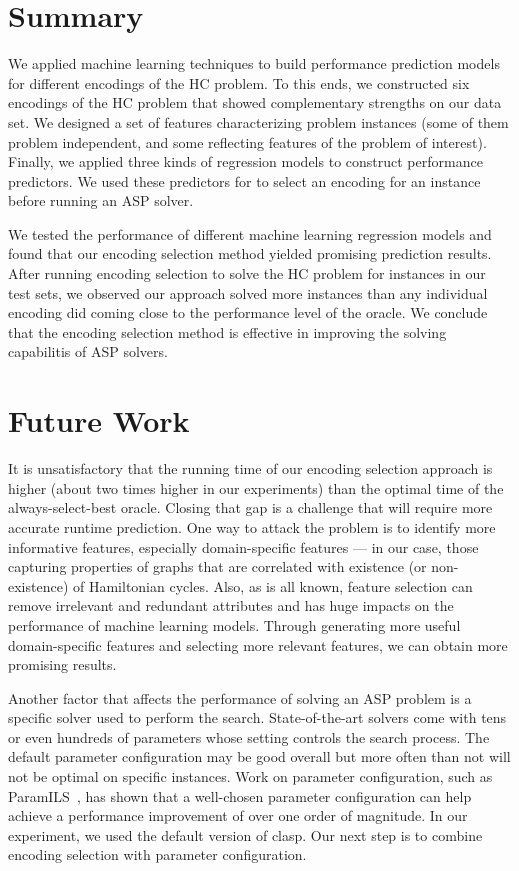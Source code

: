 \documentclass{new_tlp}
\begin{document}
\section{Summary}
We applied machine learning techniques to build performance prediction models
for different encodings of the HC problem. To this ends, we constructed
six encodings of the HC problem that showed complementary strengths on our 
data set. We designed a set of features characterizing problem instances (some
of them problem independent, and some reflecting features of the problem of 
interest). Finally, we applied three kinds of regression models to construct 
performance predictors. We used these predictors for to select an encoding 
for an instance before running an ASP solver. 

We tested the performance of different machine learning regression models and 
found that our encoding selection method yielded promising prediction results.
After running encoding selection to solve the HC problem for instances in our 
test sets, we observed our approach solved more instances than any individual 
encoding did coming close to the performance level of the oracle. We conclude 
that the encoding selection method is effective in improving the solving
capabilitis of ASP solvers.


\section{Future Work}

It is unsatisfactory that the running time of our encoding selection approach 
is higher (about two times higher in our experiments) than the optimal time of 
the always-select-best oracle. Closing that gap is a challenge that will 
require more accurate runtime prediction. One way to attack the problem is
to identify more informative features, especially domain-specific features
--- in our case, those capturing properties of graphs that are correlated 
with existence (or non-existence) of Hamiltonian cycles. Also, as is all known, feature selection can remove irrelevant and redundant attributes and has huge impacts on the performance of machine learning models. Through generating more useful domain-specific features and selecting more relevant features, we can obtain more promising results.

Another factor that affects the performance of solving an ASP problem is a 
specific solver used to perform the search. State-of-the-art solvers come 
with tens or even hundreds of parameters whose setting controls the search
process. The default parameter configuration may be good overall but more 
often than not will not be optimal on specific instances. Work on parameter
configuration, such as ParamILS~\cite{HutterHLS09}, has shown that a 
well-chosen parameter configuration can help achieve a performance improvement 
of over one order of magnitude. In our experiment, we used the default version 
of clasp. Our next step is to combine encoding selection with parameter 
configuration. 
\end{document}
